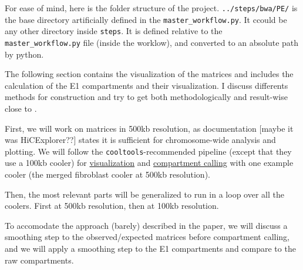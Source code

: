 \documentclass[
  a4paper,
  DIV=11,
  numbers=noendperiod]{scrartcl}
\begin{document}
\label{md-folder-structure}
For ease of mind, here is the folder structure of the project.
\texttt{../steps/bwa/PE/} is the base directory artificially defined in
the \texttt{master\_workflow.py}. It ccould be any other directory
inside \texttt{steps}. It is defined relative to the
\texttt{master\_workflow.py} file (inside the worklow), and converted to
an absolute path by python.

\begin{figure}


\caption{\label{fig-folder-structure}}

\end{figure}%

\label{md-plotting-main}
The following section contains the visualization of the matrices and
includes the calculation of the E1 compartments and their visualization.
I discuss differents methods for construction and try to get both
methodologically and result-wise close to
\citep{wang_reprogramming_2019}.

First, we will work on matrices in 500kb resolution, as documentation
{[}maybe it was HiCExplorer??{]} states it is sufficient for
chromosome-wide analysis and plotting. We will follow the
\texttt{cooltools}-recommended pipeline (except that they use a 100kb
cooler) for
\href{https://cooltools.readthedocs.io/en/latest/notebooks/viz.html}{visualization}
and
\href{https://cooltools.readthedocs.io/en/latest/notebooks/compartments_and_saddles.html}{compartment
calling} with one example cooler (the merged fibroblast cooler at 500kb
resolution).

Then, the most relevant parts will be generalized to run in a loop over
all the coolers. First at 500kb resolution, then at 100kb resolution.

To accomodate the approach (barely) described in the paper, we will
discuss a smoothing step to the observed/expected matrices before
compartment calling, and we will apply a smoothing step to the E1
compartments and compare to the raw compartments.
\end{document}
